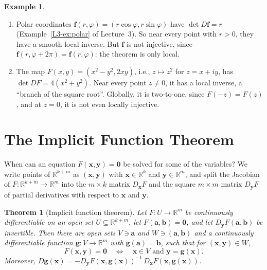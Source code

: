 \documentclass[11pt]{article}
\theoremstyle{definition}
\newtheorem{example}[definition]{Example}
\theoremstyle{plain}
\newtheorem{theorem}[definition]{Theorem}
\theoremstyle{remark}
\begin{document}
\begin{example}\label{ex:local-inverse}
    \begin{enumerate}
        \item Polar coordinates $\mathbf{f}(r, \varphi) = (r\cos\varphi, r\sin\varphi)$ have $\det D\mathbf{f} = r$ (Example~\ref{L3-ex:polar} of Lecture~3). So near every point with $r > 0$, they have a smooth local inverse. But $\mathbf{f}$ is not injective, since $\mathbf{f}(r, \varphi + 2\pi) = \mathbf{f}(r, \varphi)$: the theorem is only local.
        \item The map $F(x, y) = (x^2 - y^2, 2xy)$, i.e., $z \mapsto z^2$ for $z = x + iy$, has $\det DF = 4(x^2 + y^2)$. Near every point $z \neq 0$, it has a local inverse, a ``branch of the square root''. Globally, it is two-to-one, since $F(-z) = F(z)$, and at $z = 0$, it is not even locally injective.
    \end{enumerate}
\end{example}

\section{The Implicit Function Theorem}\label{sec:implicit}

When can an equation $F(\mathbf{x}, \mathbf{y}) = \mathbf{0}$ be solved for some of the variables? We write points of $\mathbb{R}^{k + m}$ as $(\mathbf{x}, \mathbf{y})$ with $\mathbf{x} \in \mathbb{R}^k$ and $\mathbf{y} \in \mathbb{R}^m$, and split the Jacobian of $F: \mathbb{R}^{k+m} \to \mathbb{R}^m$ into the $m \times k$ matrix $D_{\mathbf{x}}F$ and the square $m \times m$ matrix $D_{\mathbf{y}}F$ of partial derivatives with respect to $\mathbf{x}$ and $\mathbf{y}$.

\begin{theorem}[Implicit function theorem]\label{thm:implicit-function}
    Let $F: U \to \mathbb{R}^m$ be continuously differentiable on an open set $U \subseteq \mathbb{R}^{k+m}$, let $F(\mathbf{a}, \mathbf{b}) = \mathbf{0}$, and let $D_{\mathbf{y}}F(\mathbf{a}, \mathbf{b})$ be invertible. Then there are open sets $V \ni \mathbf{a}$ and $W \ni (\mathbf{a}, \mathbf{b})$ and a continuously differentiable function $\mathbf{g}: V \to \mathbb{R}^m$ with $\mathbf{g}(\mathbf{a}) = \mathbf{b}$, such that for $(\mathbf{x}, \mathbf{y}) \in W$,
    \[F(\mathbf{x}, \mathbf{y}) = \mathbf{0} \quad \Longleftrightarrow \quad \mathbf{x} \in V \text{ and } \mathbf{y} = \mathbf{g}(\mathbf{x}).\]
    Moreover, $D\mathbf{g}(\mathbf{x}) = -D_{\mathbf{y}}F(\mathbf{x}, \mathbf{g}(\mathbf{x}))^{-1}\,D_{\mathbf{x}}F(\mathbf{x}, \mathbf{g}(\mathbf{x}))$.
\end{theorem}
\end{document}
